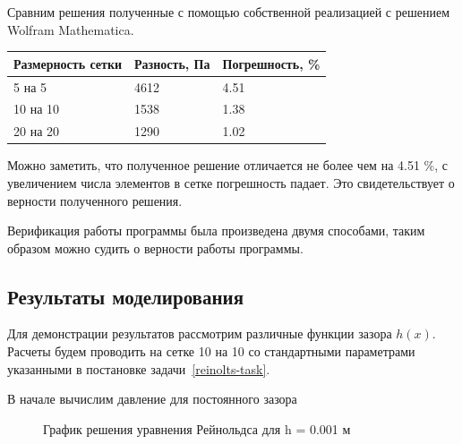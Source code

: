 \documentclass[a4paper,14pt]{extarticle}
\begin{document}
Сравним решения полученные с помощью собственной реализацией с решением Wolfram Mathematica.

\begin{table}[!htbp]
	\begin{tabular}{|l|l|l|}
		\hline
		\multicolumn{1}{|c|}{Размерность сетки} & \multicolumn{1}{c|}{Разность, Па} & Погрешность, \% \\ \hline
		5 на 5                                  & 4612                              & 4.51            \\ \hline
		10 на 10                                & 1538                              & 1.38            \\ \hline
		20 на 20                                & 1290                              & 1.02            \\ \hline
	\end{tabular}
\end{table}

Можно заметить, что полученное решение отличается не более чем на 4.51 \%, с увеличением числа элементов в сетке погрешность падает. Это свидетельствует о верности полученного решения. 

Верификация работы программы была произведена двумя способами, таким образом можно судить о верности работы программы.

\subsection{Результаты моделирования}

Для демонстрации результатов рассмотрим различные функции зазора $h(x)$.  Расчеты будем проводить на сетке 10 на 10 со стандартными параметрами указанными в постановке задачи~\eqref{reinolts-task}.

В начале вычислим давление для постоянного зазора
\begin{figure}[!htbp]
	\caption{График решения уравнения Рейнольдса для h = 0.001 м}
	\label{sol_const_h}
\end{figure}
\end{document}
